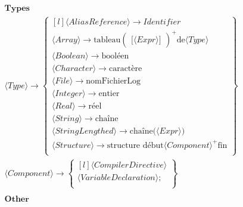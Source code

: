 \begin{align*}
\\\\&\textbf{Types} \\

&⟨Type⟩ \to \begin{Bmatrix*}[l]
    ⟨AliasReference⟩ \to Identifier \\
    ⟨Array⟩ \to \text{tableau} \begin{pmatrix}\text{[}⟨Expr⟩\text{]}\end{pmatrix}^+ \text{de} ⟨Type⟩ \\
    ⟨Boolean⟩ \to \text{booléen} \\
    ⟨Character⟩ \to \text{caractère} \\
    ⟨File⟩ \to \text{nomFichierLog} \\
    ⟨Integer⟩ \to \text{entier} \\
    ⟨Real⟩ \to \text{réel} \\
    ⟨String⟩ \to \text{chaîne} \\
    ⟨StringLengthed⟩ \to \text{chaîne}\text{(}⟨Expr⟩\text{)} \\
    ⟨Structure⟩ \to \text{structure\ début} ⟨Component⟩^+ \text{fin} \\
\end{Bmatrix*}
\\
&⟨Component⟩ \to \begin{Bmatrix*}[l]
    ⟨CompilerDirective⟩ \\
    ⟨VariableDeclaration⟩\text{;} \\
\end{Bmatrix*}

\\\\&\textbf{Other} \\


\end{align*}
